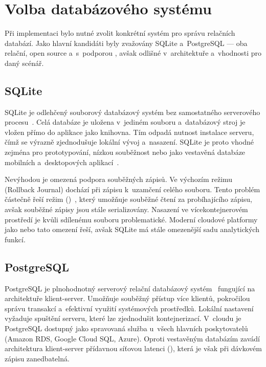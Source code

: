 \section{Volba databázového systému}
\label{sec:implementation:db_choice}

Při implementaci bylo nutné zvolit konkrétní systém pro správu relačních databází. Jako hlavní kandidáti byly zvažovány SQLite a~PostgreSQL — oba relační, open source a~s~podporou \SQL, avšak odlišné v~architektuře a~vhodnosti pro daný scénář.

\subsection{SQLite}
\label{subsec:implementation:db_choice:sqlite}

SQLite je odlehčený souborový databázový systém bez samostatného serverového procesu~\cite{sqlite_about}. Celá databáze je uložena v~jediném souboru a~databázový stroj je vložen přímo do aplikace jako knihovna. Tím odpadá nutnost instalace serveru, čímž se výrazně zjednodušuje lokální vývoj a~nasazení. SQLite je proto vhodné zejména pro prototypování, nízkou souběžnost nebo jako vestavěná databáze mobilních a~desktopových aplikací~\cite{sqlite_when_to_use}.

Nevýhodou je omezená podpora souběžných zápisů. Ve výchozím režimu (Rollback Journal) dochází při zápisu k~uzamčení celého souboru. Tento problém částečně řeší \WAL režim ()~\cite{sqlite_wal}, který umožňuje souběžné čtení za probíhajícího zápisu, avšak souběžné zápisy jsou stále serializovány. Nasazení ve vícekontejnerovém prostředí je kvůli sdílenému souboru problematické. Moderní cloudové platformy jako  nebo  tato omezení řeší, avšak SQLite má stále omezenější sadu analytických \SQL funkcí.

\subsection{PostgreSQL}
\label{subsec:implementation:db_choice:postgresql}

PostgreSQL je plnohodnotný serverový relační databázový systém~\cite{postgresql_about} fungující na architektuře klient-server. Umožňuje souběžný přístup více klientů, pokročilou správu transakcí a~efektivní využití systémových prostředků. Lokální nastavení vyžaduje spuštění serveru, které lze zjednodušit kontejnerizací. V~cloudu je PostgreSQL dostupný jako spravovaná služba u~všech hlavních poskytovatelů (Amazon RDS, Google Cloud SQL, Azure). Oproti vestavěným databázím zavádí architektura klient-server přídavnou síťovou latenci (\TCPIP), která je však při dávkovém zápisu zanedbatelná.

